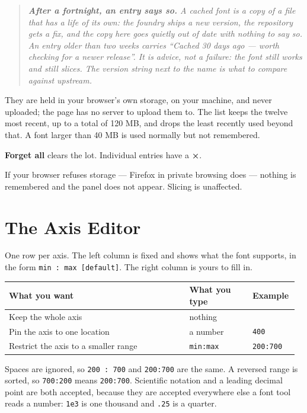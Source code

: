 \documentclass[11pt,a4paper]{article}
\newenvironment{callout}%
  {\begin{quote}\itshape\small}%
  {\end{quote}}
\begin{document}
\begin{callout}
\textbf{After a fortnight, an entry says so.} A cached font is a copy of a file that has a life of its own: the foundry ships a new version, the repository gets a fix, and the copy here goes quietly out of date with nothing to say so. An entry older than two weeks carries \emph{``Cached 30 days ago --- worth checking for a newer release''}. It is advice, not a failure: the font still works and still slices. The version string next to the name is what to compare against upstream.
\end{callout}

They are held in your browser's own storage, on your machine, and never uploaded; the page has no server to upload them to. The list keeps the twelve most recent, up to a total of 120 MB, and drops the least recently used beyond that. A font larger than 40 MB is used normally but not remembered.

\textbf{Forget all} clears the lot. Individual entries have a \textbf{×}.

If your browser refuses storage --- Firefox in private browsing does --- nothing is remembered and the panel does not appear. Slicing is unaffected.

\section{The Axis Editor}

One row per axis. The left column is fixed and shows what the font supports, in the form \texttt{min : max [default]}. The right column is yours to fill in.

\begin{longtable}{>{\RaggedRight\arraybackslash}p{0.6020689655172413\linewidth}>{\RaggedRight\arraybackslash}p{0.21741379310344824\linewidth}>{\RaggedRight\arraybackslash}p{0.15051724137931033\linewidth}}
\toprule
\textbf{What you want} & \textbf{What you type} & \textbf{Example} \\
\midrule\endhead
Keep the whole axis & nothing &  \\
Pin the axis to one location & a number & \texttt{400} \\
Restrict the axis to a smaller range & \texttt{min:max} & \texttt{200:700} \\
\bottomrule
\end{longtable}

Spaces are ignored, so \texttt{200 : 700} and \texttt{200:700} are the same. A reversed range is sorted, so \texttt{700:200} means \texttt{200:700}. Scientific notation and a leading decimal point are both accepted, because they are accepted everywhere else a font tool reads a number: \texttt{1e3} is one thousand and \texttt{.25} is a quarter.
\end{document}
